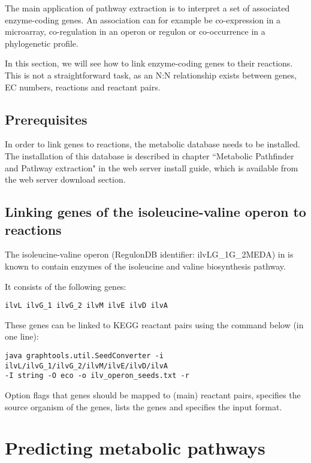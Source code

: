 The main application of pathway extraction is to interpret a set of
associated enzyme-coding genes. An association can for example be co-expression
in a microarray, co-regulation in an operon or regulon or co-occurrence in a
phylogenetic profile.

In this section, we will see how to link enzyme-coding genes to their reactions.
This is not a straightforward task, as an N:N relationship exists between genes,
EC numbers, reactions and reactant pairs.

\subsection{Prerequisites}\label{metabolicdb}
In order to link genes to reactions, the metabolic database needs to be
installed. The installation of this database is described in chapter
``Metabolic Pathfinder and Pathway extraction" in the \neat web server install
guide, which is available from the \neat web server download section. 

\subsection{Linking genes of the isoleucine-valine operon to
reactions}\label{ilv_operon}

The isoleucine-valine operon (RegulonDB identifier: ilvLG\_1G\_2MEDA) in
 is known to contain enzymes of
the isoleucine and valine biosynthesis pathway. 

It consists of the following genes:

\begin{lstlisting}
ilvL ilvG_1 ilvG_2 ilvM ilvE ilvD ilvA
\end{lstlisting}

These genes can be linked to KEGG reactant pairs using the command below (in one
line):

\begin{verbatim}
java graphtools.util.SeedConverter -i ilvL/ilvG_1/ilvG_2/ilvM/ilvE/ilvD/ilvA 
-I string -O eco -o ilv_operon_seeds.txt -r
\end{verbatim}

Option  flags that genes should be mapped to (main) reactant pairs,
 specifies the source organism of the genes,  lists the
genes and  specifies the input format.

\section{Predicting metabolic pathways}

